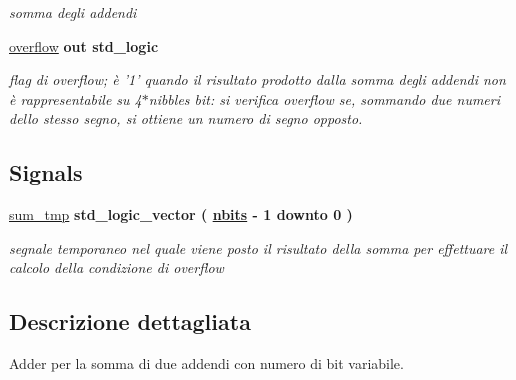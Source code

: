 \begin{DoxyCompactItemize}
\begin{DoxyCompactList}\small\item\em somma degli addendi \end{DoxyCompactList}\item 
\hyperlink{group___adder_ga9650307dde287e0bcfa1e26370c006c2}{overflow}  {\bfseries {\bfseries \textcolor{vhdlchar}{out}\textcolor{vhdlchar}{ }}} {\bfseries \textcolor{vhdlchar}{std\+\_\+logic}\textcolor{vhdlchar}{ }} 
\begin{DoxyCompactList}\small\item\em flag di overflow; è '1' quando il risultato prodotto dalla somma degli addendi non è rappresentabile su 4$\ast$nibbles bit\+: si verifica overflow se, sommando due numeri dello stesso segno, si ottiene un numero di segno opposto. \end{DoxyCompactList}\end{DoxyCompactItemize}
\subsection*{Signals}
 \begin{DoxyCompactItemize}
\item 
\hyperlink{group___adder_ga590914af948ec283f1371002f2f76720}{sum\+\_\+tmp} {\bfseries \textcolor{vhdlchar}{std\+\_\+logic\+\_\+vector}\textcolor{vhdlchar}{ }\textcolor{vhdlchar}{(}\textcolor{vhdlchar}{ }\textcolor{vhdlchar}{ }\textcolor{vhdlchar}{ }\textcolor{vhdlchar}{ }{\bfseries \hyperlink{group___adder_gae1435c07d0cd54b521535e2f8de6f94e}{nbits}} \textcolor{vhdlchar}{-\/}\textcolor{vhdlchar}{ } \textcolor{vhdldigit}{1} \textcolor{vhdlchar}{ }\textcolor{vhdlchar}{downto}\textcolor{vhdlchar}{ }\textcolor{vhdlchar}{ } \textcolor{vhdldigit}{0} \textcolor{vhdlchar}{ }\textcolor{vhdlchar}{)}\textcolor{vhdlchar}{ }} 
\begin{DoxyCompactList}\small\item\em segnale temporaneo nel quale viene posto il risultato della somma per effettuare il calcolo della condizione di overflow \end{DoxyCompactList}\end{DoxyCompactItemize}


\subsection{Descrizione dettagliata}
Adder per la somma di due addendi con numero di bit variabile. 



